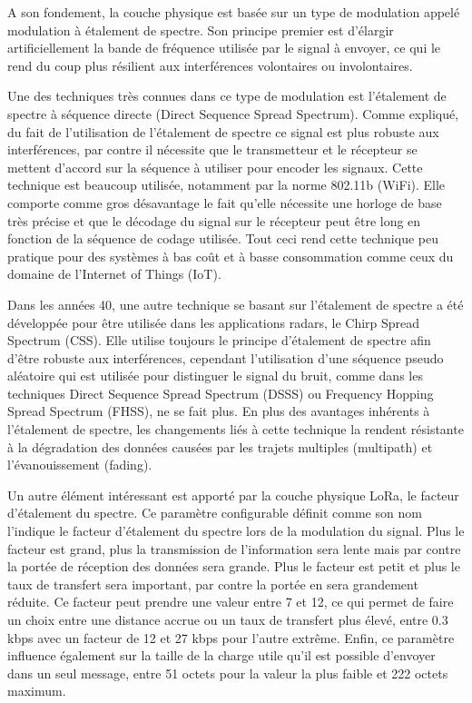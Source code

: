 A son fondement, la couche physique est basée sur un type de modulation appelé modulation à étalement de spectre. Son principe premier est d'élargir artificiellement la bande de fréquence utilisée par le signal à envoyer, ce qui le rend du coup plus résilient aux interférences volontaires ou involontaires.

Une des techniques très connues dans ce type de modulation est l’étalement de spectre à séquence directe (Direct Sequence Spread Spectrum). Comme expliqué, du fait de l'utilisation de l'étalement de spectre ce signal est plus robuste aux interférences, par contre il nécessite que le transmetteur et le récepteur se mettent d’accord sur la séquence à utiliser pour encoder les signaux. Cette technique est beaucoup utilisée, notamment par la norme 802.11b (WiFi). Elle comporte comme gros désavantage le fait qu’elle nécessite une horloge de base très précise et que le décodage du signal sur le récepteur peut être long en fonction de la séquence de codage utilisée. Tout ceci rend cette technique peu pratique pour des systèmes à bas coût et à basse consommation comme ceux du domaine de l’Internet of Things (IoT).

Dans les années 40, une autre technique se basant sur l’étalement de spectre a été développée pour être utilisée dans les applications radars, le Chirp Spread Spectrum (CSS). Elle utilise toujours le principe d’étalement de spectre afin d’être robuste aux interférences, cependant l’utilisation d’une séquence pseudo aléatoire qui est utilisée pour distinguer le signal du bruit, comme dans les techniques Direct Sequence Spread Spectrum (DSSS) ou Frequency Hopping Spread Spectrum (FHSS), ne se fait plus. En plus des avantages inhérents à l’étalement de spectre, les changements liés à cette technique la rendent résistante à la dégradation des données causées par les trajets multiples (multipath) et l’évanouissement (fading). \cite{lora_modulation_basics}

Un autre élément intéressant est apporté par la couche physique LoRa, le facteur d'étalement du spectre. Ce paramètre configurable définit comme son nom l'indique le facteur d'étalement du spectre lors de la modulation du signal. Plus le facteur est grand, plus la transmission de l’information sera lente mais par contre la portée de réception des données sera grande. Plus le facteur est petit et plus le taux de transfert sera important, par contre la portée en sera grandement réduite. Ce facteur peut prendre une valeur entre 7 et 12, ce qui permet de faire un choix entre une distance accrue ou un taux de transfert plus élevé, entre 0.3 kbps avec un facteur de 12 et 27 kbps pour l'autre extrême. Enfin, ce paramètre influence également sur la taille de la charge utile qu'il est possible d'envoyer dans un seul message, entre 51 octets pour la valeur la plus faible et 222 octets maximum. \cite{limits_lorawan}

